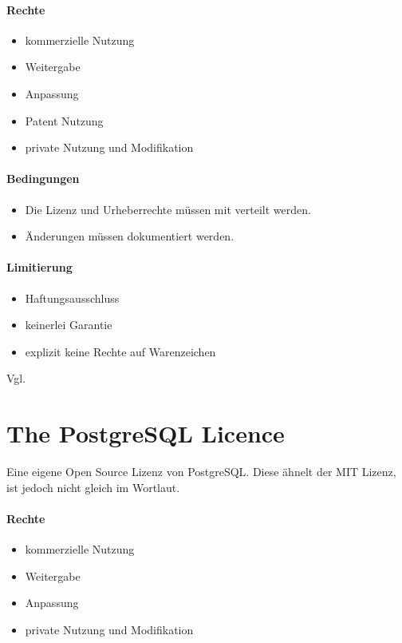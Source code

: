 \paragraph{Rechte}
\begin{itemize}
    \item kommerzielle Nutzung
    \item Weitergabe
    \item Anpassung
    \item Patent Nutzung %
    \item private Nutzung und Modifikation
\end{itemize}

\paragraph{Bedingungen}
\begin{itemize}
    \item Die Lizenz und Urheberrechte müssen mit verteilt werden.
    \item Änderungen müssen dokumentiert werden.
\end{itemize}

\paragraph{Limitierung}
\begin{itemize}
    \item Haftungsausschluss
    \item keinerlei Garantie
    \item explizit keine Rechte auf Warenzeichen
\end{itemize}
Vgl. \cite{choosealicense-com}

\section{The PostgreSQL Licence}\label{sec:the-postgresql-licence}
Eine eigene Open Source Lizenz von PostgreSQL.
Diese ähnelt der MIT Lizenz, ist jedoch nicht gleich im Wortlaut.

\paragraph{Rechte}
\begin{itemize}
    \item kommerzielle Nutzung
    \item Weitergabe
    \item Anpassung
    \item private Nutzung und Modifikation
\end{itemize}

